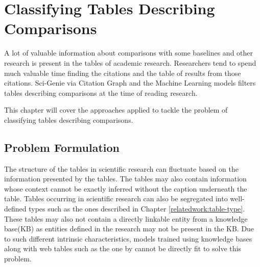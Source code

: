 \chapter{Classifying Tables Describing Comparisons}
\label{table_classification}
A lot of valuable information about comparisons with some baselines and other research is present in the tables of academic research. Researchers tend to spend much valuable time finding the citations and the table of results from those citations. Sci-Genie via Citation Graph and the Machine Learning models filters tables describing comparisons at the time of reading research. 

This chapter will cover the approaches applied to tackle the problem of classifying tables describing comparisons.

\section{Problem Formulation}

The structure of the tables in scientific research can fluctuate based on the information presented by the tables. The tables may also contain information whose context cannot be exactly inferred without the caption underneath the table. Tables occurring in scientific research can also be segregated into well-defined types such as the ones described in Chapter \ref{relatedwork:table-type}. These tables may also not contain a directly linkable entity from a knowledge base(KB) as entities defined in the research may not be present in the KB. Due to such different intrinsic characteristics, models trained using knowledge bases along with web tables such as the one by \cite{deng2020turl} cannot be directly fit to solve this problem.

